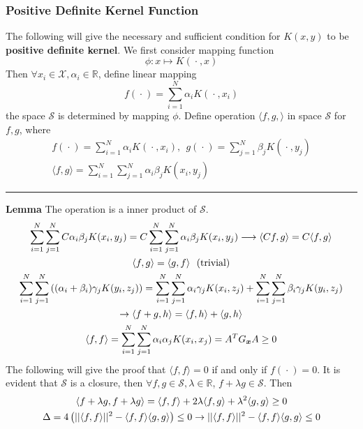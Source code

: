 \documentclass[12pt]{article}
\newcommand{\bdot}{~\bm{\cdot}~}
\newcommand{\la}{\langle}
\newcommand{\ra}{\rangle}
\begin{document}
\subsubsection{Positive Definite Kernel Function}
The following will give the necessary and sufficient condition for $K(x, y)$ to be \textbf{positive definite kernel}. We first consider mapping function
\begin{equation}
    \phi: x \mapsto K(\bdot, x)
\end{equation}
Then $\forall x_i \in \mathcal{X},\alpha_i \in \mathbb{R}$, define linear mapping
\begin{equation}
    f(\bdot) = \sum_{i=1}^N \alpha_i K(\bdot, x_i)
\end{equation} 
the space $\mathcal{S}$ is determined by mapping $\phi$. Define operation $\langle f, g, \rangle$ in space $\mathcal{S}$ for $f, g$, where
\begin{gather}
    f(\bdot) = \sum_{i=1}^N \alpha_i K(\bdot, x_i),~~
    g(\bdot) = \sum_{j=1}^N \beta_j K(\bdot, y_j) \\
    \langle f, g \rangle = \sum_{i=1}^N\sum_{j=1}^N \alpha_i \beta_j K(x_i, y_j)
\end{gather}
\rule[-5pt]{\linewidth}{0.07em}
\noindent \textbf{Lemma} The operation is a inner product of $\mathcal{S}$.
\begin{gather}
    \sum_{i=1}^N\sum_{j=1}^N C\alpha_i \beta_j K(x_i, y_j) = C\sum_{i=1}^N\sum_{j=1}^N \alpha_i \beta_j K(x_i, y_j) \longrightarrow \la Cf, g \ra = C\la f, g \ra \\
    \la f, g \ra = \la g, f \ra~~(\text{trivial}) \\
    \sum_{i=1}^N\sum_{j=1}^N \left( (\alpha_i + \beta_i) \gamma_j K(y_i, z_j) \right) = \sum_{i=1}^N\sum_{j=1}^N  \alpha_i \gamma_j K(x_i, z_j) + \sum_{i=1}^N \sum_{j=1}^N \beta_i \gamma_j K(y_i, z_j) \notag\\ \rightarrow \la f+g, h \ra = \la f, h \ra + \la g, h \ra \\
    \la f, f \ra = \sum_{i=1}^N \sum_{j=1}^N \alpha_i \alpha_j K(x_i, x_j) = A^TG_{\bm{x}}A \geq 0 
\end{gather}
The following will give the proof that $\la f, f \ra = 0$ if and only if $f(\bdot) = 0$. It is evident that $\mathcal{S}$ is a closure, then $\forall f, g \in \mathcal{S}, \lambda \in \mathbb{R}$, $f + \lambda g \in \mathcal{S}$. Then
\begin{gather}
    \la f + \lambda g, f + \lambda g \ra = \la f, f \ra + 2\lambda \la f, g \ra + \lambda^2 \la g, g \ra \geq 0 \notag \\
    \Delta = 4\left(||\la f, f \ra ||^2 - \la f, f \ra \la g, g \ra \right) \leq 0 \rightarrow ||\la f, f \ra ||^2 - \la f, f \ra \la g, g \ra \leq 0
\end{gather}
\end{document}
